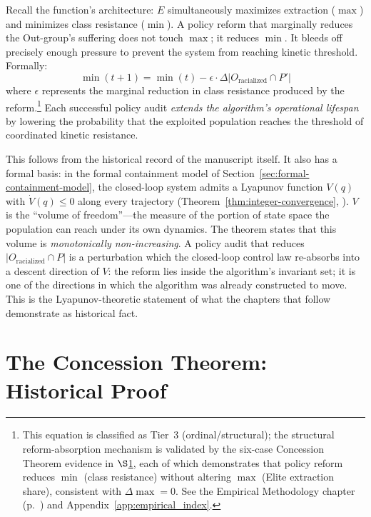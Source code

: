Recall the function's architecture: $E$ simultaneously maximizes extraction ($\max$) and minimizes class resistance ($\min$). A policy reform that marginally reduces the Out-group's suffering does not touch $\max$; it reduces $\min$. It bleeds off precisely enough pressure to prevent the system from reaching kinetic threshold. Formally:
\begin{equation}\label{eq:12.1-reform-absorption-mechanism}
\min(t+1) = \min(t) - \epsilon \cdot \Delta|O_{\text{racialized}} \cap P'|
\end{equation}
where $\epsilon$ represents the marginal reduction in class resistance produced by the reform.\footnote{This equation is classified as Tier~3 (ordinal/structural); the structural reform-absorption mechanism is validated by the six-case Concession Theorem evidence in $\S$\ref{sec:concession_theorem}, each of which demonstrates that policy reform reduces $\min$ (class resistance) without altering $\max$ (Elite extraction share), consistent with $\Delta\max = 0$. See the Empirical Methodology chapter (p.~\pageref{ch:empirical_methodology}) and Appendix~\ref{app:empirical_index}.} Each successful policy audit \textit{extends the algorithm's operational lifespan} by lowering the probability that the exploited population reaches the threshold of coordinated kinetic resistance.

This follows from the historical record of the manuscript itself. It also has a formal basis: in the formal containment model of Section~\ref{sec:formal-containment-model}, the closed-loop system admits a Lyapunov function $V(q)$ with $\dot V(q) \leq 0$ along every trajectory (Theorem~\ref{thm:integer-convergence}, \cite{khalil_nonlinear, kan_containment}). $V$ is the ``volume of freedom''---the measure of the portion of state space the population can reach under its own dynamics. The theorem states that this volume is \textit{monotonically non-increasing}. A policy audit that reduces $|O_{\text{racialized}} \cap P|$ is a perturbation which the closed-loop control law re-absorbs into a descent direction of $V$: the reform lies inside the algorithm's invariant set; it is one of the directions in which the algorithm was already constructed to move. This is the Lyapunov-theoretic statement of what the chapters that follow demonstrate as historical fact.

\section{The Concession Theorem: Historical Proof}
\label{sec:concession_theorem}

